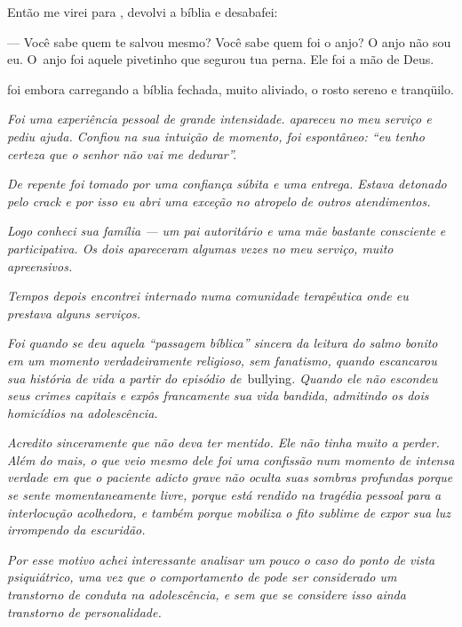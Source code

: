 Então me virei para , devolvi a bíblia e desabafei:

— Você sabe quem te salvou mesmo? Você sabe quem foi o anjo? O anjo não
sou eu. O~anjo foi aquele pivetinho que segurou tua perna. Ele foi a mão
de Deus.

 foi embora carregando a bíblia fechada, muito aliviado, o rosto
sereno e tranqüilo.

\begin{center}\asterisc{}\end{center}


\emph{Foi uma experiência pessoal de grande intensidade.  apareceu no
meu serviço e pediu ajuda. Confiou na sua intuição de momento, foi
espontâneo: ``eu tenho certeza que o senhor não vai me dedurar''.}~

\emph{De repente  foi tomado por uma confiança súbita e uma entrega.
Estava detonado pelo crack e por isso eu abri uma exceção no atropelo de
outros atendimentos.}~

\emph{Logo conheci sua família --- um pai autoritário e uma mãe bastante
consciente e participativa. Os dois apareceram algumas vezes no meu
serviço, muito apreensivos.}~

\emph{Tempos depois encontrei  internado numa comunidade terapêutica
onde eu prestava alguns serviços.}~

\emph{Foi quando se deu aquela ``passagem bíblica'' sincera da leitura
do salmo bonito em um momento verdadeiramente religioso, sem fanatismo,
quando  escancarou sua história de vida a partir do episódio
de}~bullying\emph{. Quando ele não escondeu seus crimes capitais e expôs
francamente sua vida bandida, admitindo os dois homicídios na
adolescência.}~

\emph{Acredito sinceramente que  não deva ter mentido. Ele não tinha
muito a perder. Além do mais, o que veio mesmo dele foi uma confissão
num momento de intensa verdade em que o paciente adicto grave não oculta
suas sombras profundas porque se sente momentaneamente livre, porque
está rendido na tragédia pessoal para a interlocução acolhedora, e
também porque mobiliza o fito sublime de expor sua luz irrompendo da
escuridão.}~

\emph{Por esse motivo achei interessante analisar um pouco o caso do
ponto de vista psiquiátrico, uma vez que o comportamento de  pode ser
considerado um transtorno de conduta na adolescência, e sem que se
considere isso ainda transtorno de personalidade.}~

